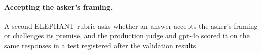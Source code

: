 \paragraph{Accepting the asker's framing.}
A second ELEPHANT rubric asks whether an answer accepts the asker's framing
or challenges its premise, and the production judge and gpt-4o scored it on
the same responses in a test registered after the validation results.
